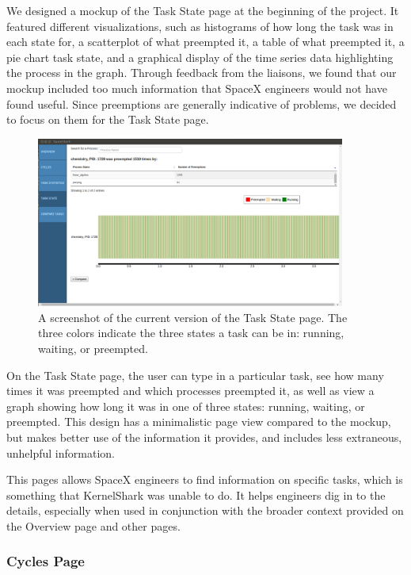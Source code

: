 \documentclass{hmcclinic}
\begin{document}
We designed a mockup of the Task State page at the
beginning of the project. It featured different visualizations,
such as histograms of how long the task was in each state for, a scatterplot of
what preempted it, a table of what preempted it, a pie chart task state, and a
graphical display of the time series data highlighting the process in the graph.
Through feedback from the liaisons, we found that our mockup included
too much information that SpaceX engineers would not have found useful. Since
preemptions are generally indicative of problems, we decided to focus on
them for the Task State page.

\begin{figure}[H]
\begin{center}
\includegraphics[width=4in]{task-state-page.png}
\caption{A screenshot of the current version of the Task State page. The three
colors indicate the three states a task can be in: running, waiting, or
preempted.}
\end{center}
\end{figure}

On the Task State page, the user can type in a particular task, see
how many times it was preempted and which processes preempted it, as well as
view a graph showing how long it was in one of three states: running, waiting,
or preempted. This design has a minimalistic page view compared to the mockup,
but makes better use of the information it provides, and includes less
extraneous, unhelpful information.

This pages allows SpaceX engineers to find information on specific tasks, which
is something that KernelShark was unable to do. It helps engineers dig in to the
details, especially when used in conjunction with the broader context provided
on the Overview page and other pages.

\subsubsection{Cycles Page}
\end{document}

